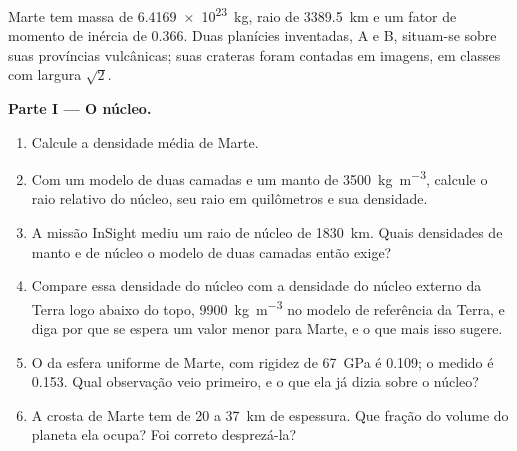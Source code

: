 \begin{problem}
\label{pb:b3:planetary-interiors-surfaces:1}
Marte tem massa de \qty{6.4169e23}{kg}, raio de \qty{3389.5}{km} e um
fator de momento de inércia de 0.366. Duas planícies inventadas, A e B, situam-se
sobre suas províncias vulcânicas; suas crateras foram contadas em imagens, em classes
com largura $\sqrt2$.

\medskip\noindent\textbf{Parte I --- O núcleo.}
\begin{enumerate}
\item Calcule a densidade média de Marte.
\item Com um modelo de duas camadas e um manto de \qty{3500}{kg.m^{-3}}, calcule
  o raio relativo do núcleo, seu raio em quilômetros e sua
  densidade.
\item A missão InSight mediu um raio de núcleo de \qty{1830}{km}. Quais densidades de manto e de núcleo
  o modelo de duas camadas então exige?
\item Compare essa densidade do núcleo com a densidade do núcleo externo da Terra
  logo abaixo do topo, \qty{9900}{kg.m^{-3}} no modelo de referência da Terra,
  e diga por que se espera um valor menor para Marte, e o que mais isso
  sugere.
\item O  da esfera uniforme de Marte, com rigidez de
  \qty{67}{GPa} é 0.109; o medido é 0.153. Qual observação veio
  primeiro, e o que ela já dizia sobre o núcleo?
\item A crosta de Marte tem de 20 a \qty{37}{km} de espessura. Que fração do
  volume do planeta ela ocupa? Foi correto desprezá-la?
\end{enumerate}


\end{problem}
